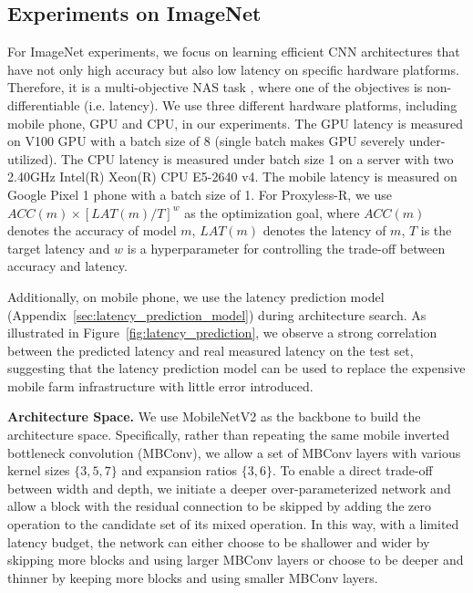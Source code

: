 \documentclass{article} \usepackage{iclr2019_conference,times}
\newcommand{\minisection}[1]{\vspace{5pt}\noindent\textbf{#1.}}
\begin{document}
\subsection{Experiments on ImageNet}
For ImageNet experiments, we focus on learning efficient CNN architectures \citep{iandola2016squeezenet,howard2017mobilenets,sandler2018mobilenetv2,zhu2018sparsenet} that have not only high accuracy but also low latency on specific hardware platforms. Therefore, it is a multi-objective NAS task \citep{hsu2018monas,dong2018dpp,elsken2018multi,he2018amc,wang2019haq,tan2018mnasnet}, where one of the objectives is non-differentiable (i.e. latency). We use three different hardware platforms, including mobile phone, GPU and CPU, in our experiments. The GPU latency is measured on V100 GPU with a batch size of 8 (single batch makes GPU severely under-utilized). The CPU latency is measured under batch size 1 on a server with two 2.40GHz Intel(R) Xeon(R) CPU E5-2640 v4. The mobile latency is measured on Google Pixel 1 phone with a batch size of 1. For Proxyless-R, we use $ACC(m) \times [ LAT(m) / T]^w$ as the optimization goal, where $ACC(m)$ denotes the accuracy of model $m$, $LAT(m)$ denotes the latency of $m$, $T$ is the target latency and $w$ is a hyperparameter for controlling the trade-off between accuracy and latency. 

Additionally, on mobile phone, we use the latency prediction model (Appendix~\ref{sec:latency_prediction_model}) during architecture search. As illustrated in Figure~\ref{fig:latency_prediction}, we observe a strong correlation between the predicted latency and real measured latency on the test set, suggesting that the latency prediction model can be used to replace the expensive mobile farm infrastructure \citep{tan2018mnasnet} with little error introduced. 

\minisection{Architecture Space} We use MobileNetV2 \citep{sandler2018mobilenetv2} as the backbone to build the architecture space. Specifically, rather than repeating the same mobile inverted bottleneck convolution (MBConv), we allow a set of MBConv layers with various kernel sizes $\{3, 5, 7\}$ and expansion ratios $\{3, 6\}$. To enable a direct trade-off between width and depth, we initiate a deeper over-parameterized network and allow a block with the residual connection to be skipped by adding the zero operation to the candidate set of its mixed operation. In this way, with a limited latency budget, the network can either choose to be shallower and wider by skipping more blocks and using larger MBConv layers or choose to be deeper and thinner by keeping more blocks and using smaller MBConv layers.
\end{document}
